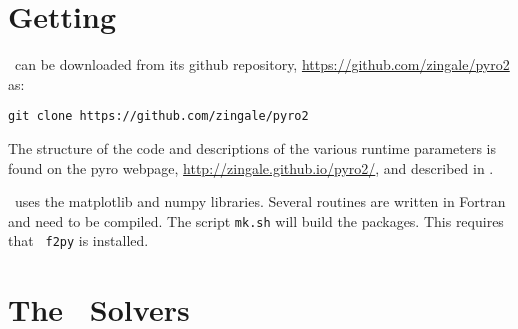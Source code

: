 \label{app:pyro}


\begin{quote}
\end{quote}



\section{Getting \pyro}

\pyro\ can be downloaded from its github repository, \url{https://github.com/zingale/pyro2} as:
\begin{verbatim}
git clone https://github.com/zingale/pyro2
\end{verbatim}

The structure of the code and descriptions of the various runtime
parameters is found on the pyro webpage,
\url{http://zingale.github.io/pyro2/}, and described
in \cite{pyro}.

\pyro\ uses the {\sf matplotlib} and {\sf numpy} libraries.
Several routines are written in Fortran and need to be compiled.  The
script {\tt mk.sh} will build the packages.  This requires that {\tt
f2py} is installed.  


\section{The \pyro\ Solvers}

